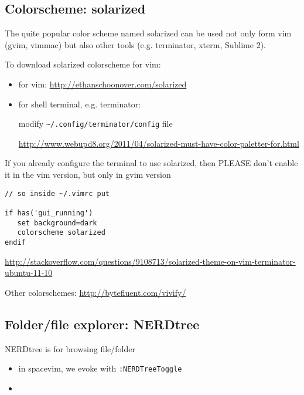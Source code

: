 \subsection{Colorscheme: solarized}

The quite popular color scheme named solarized can be used not only form vim
(gvim, vimmac) but also other tools (e.g. terminator, xterm, Sublime 2).

To download solarized colorscheme for vim: 
\begin{itemize}
  \item for vim: \url{http://ethanschoonover.com/solarized}
  
  \item for shell terminal, e.g. terminator:
  
  modify \verb!~/.config/terminator/config! file
  
  \url{http://www.webupd8.org/2011/04/solarized-must-have-color-paletter-for.html}
\end{itemize}


If you already configure the terminal to use solarized, then PLEASE don't enable
it in the vim version, but only in gvim version
\begin{verbatim}
// so inside ~/.vimrc put

if has('gui_running')
   set background=dark
   colorscheme solarized
endif
\end{verbatim}
\url{http://stackoverflow.com/questions/9108713/solarized-theme-on-vim-terminator-ubuntu-11-10}

Other colorschemes:
\url{http://bytefluent.com/vivify/}

\subsection{Folder/file explorer: NERDtree}	
\label{sec:browse_folder}
\label{sec:NERDtree}

NERDtree is for browsing file/folder
\begin{itemize}
  \item in spacevim, we evoke with \verb!:NERDTreeToggle! 
  
  \item 
\end{itemize}

